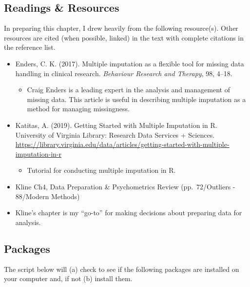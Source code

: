 \documentclass[
  11pt,
]{book}
\providecommand{\tightlist}{%
  \setlength{\itemsep}{0pt}\setlength{\parskip}{0pt}}
\begin{document}
\hypertarget{readings-resources-3}{%
\subsection{Readings \& Resources}\label{readings-resources-3}}

In preparing this chapter, I drew heavily from the following resource(s). Other resources are cited (when possible, linked) in the text with complete citations in the reference list.

\begin{itemize}
\tightlist
\item
  Enders, C. K. (2017). Multiple imputation as a flexible tool for missing data handling in clinical research. \emph{Behaviour Research and Therapy}, 98, 4--18.

  \begin{itemize}
  \tightlist
  \item
    Craig Enders is a leading expert in the analysis and management of missing data. This article is useful in describing multiple imputation as a method for managing missingness.
  \end{itemize}
\item
  Katitas, A. (2019). Getting Started with Multiple Imputation in R. University of Virginia Library: Research Data Services + Sciences. \url{https://library.virginia.edu/data/articles/getting-started-with-multiple-imputation-in-r}

  \begin{itemize}
  \tightlist
  \item
    Tutorial for conducting multiple imputation in R.
  \end{itemize}
\item
  Kline Ch4, Data Preparation \& Psychometrics Review (pp.~72/Outliers - 88/Modern Methods)
\item
  Kline's chapter is my ``go-to'' for making decisions about preparing data for analysis.
\end{itemize}

\hypertarget{packages-3}{%
\subsection{Packages}\label{packages-3}}

The script below will (a) check to see if the following packages are installed on your computer and, if not (b) install them.
\end{document}
